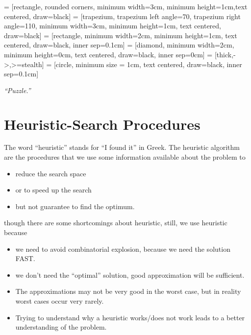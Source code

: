 
\usepackage{makecell}

\usetikzlibrary{shapes.geometric, arrows}
     = [rectangle, rounded corners, minimum width=3cm, minimum height=1cm,text centered, draw=black]
     = [trapezium, trapezium left angle=70, trapezium right angle=110, minimum width=3cm, minimum height=1cm, text centered, draw=black]
     = [rectangle, minimum width=2cm, minimum height=1cm, text centered, draw=black, inner sep=0.1cm]
     = [diamond, minimum width=2cm, minimum height=0cm, text centered, draw=black, inner sep=0cm]
     = [thick,->,>=stealth]
     = [circle, minimum size = 1cm, text centered, draw=black, inner sep=0.1cm]

\renewcommand{\docTitle}{Lecture Note - Heuristic and Metaheuristics}
\renewcommand{\docAuthor}{Lan Peng, Ph.D.}
\renewcommand{\docAffil}{School of Management, Shanghai University, Shanghai, China}

    \titleSec

    \begin{center}
        \textit{``Puzzle.''}
    \end{center}

    \section{Heuristic-Search Procedures}

        The word ``heuristic'' stands for ``I found it'' in Greek. The heuristic algorithm are the procedures that we use some information available about the problem to
        \begin{itemize}
            \item reduce the search space
            \item or to speed up the search
            \item but not guarantee to find the optimum.
        \end{itemize}

        though there are some shortcomings about heuristic, still, we use heuristic because
        \begin{itemize}
            \item we need to avoid combinatorial explosion, because we need the solution FAST.
            \item we don't need the ``optimal'' solution, good approximation will be sufficient.
            \item The approximations may not be very good in the worst case, but in reality worst cases occur very rarely.
            \item Trying to understand why a heuristic works/does not work leads to a better understanding of the problem.
        \end{itemize}

